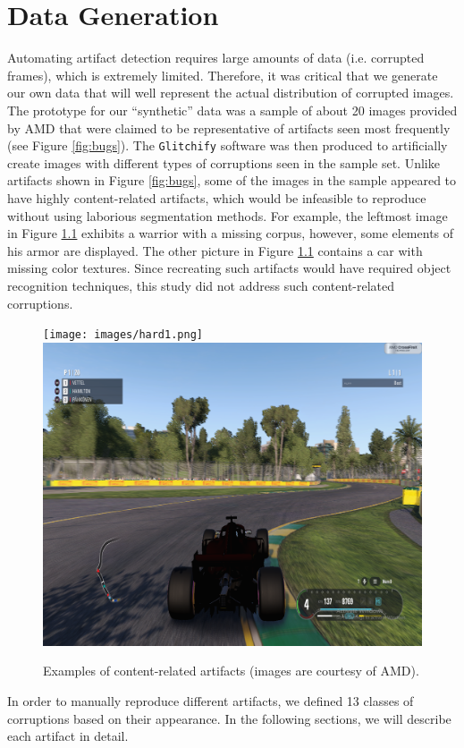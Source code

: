 \chapter{Data Generation}\label{Ch:datagen}

Automating artifact detection requires large amounts of data (i.e. corrupted frames), which is extremely limited. Therefore, it was critical that we generate our own data that will well represent the actual distribution of corrupted images. The prototype for our ``synthetic'' data was a sample of about 20 images provided by AMD that were claimed to be representative of artifacts seen most frequently (see Figure \ref{fig:bugs}). The \texttt{Glitchify} software was then produced to artificially create images with different types of corruptions seen in the sample set. Unlike artifacts shown in Figure \ref{fig:bugs}, some of the images in the sample appeared to have highly content-related artifacts, which would be infeasible to reproduce without using laborious segmentation methods. For example, the leftmost image in Figure \ref{fig:hard} exhibits a warrior with a missing corpus, however, some elements of his armor are displayed. The other picture in Figure \ref{fig:hard} contains a car with missing color textures. Since recreating such artifacts would have required object recognition techniques, this study did not address such content-related corruptions.

\begin{figure}[H]
\centering
\texttt{[image: images/hard1.png]}
\includegraphics[scale=0.181]{images/hard2.png}
\vspace{5pt}
\caption[Examples of content-related artifacts]{Examples of content-related artifacts (images are courtesy of AMD).}
\label{fig:hard}
\end{figure}
\noindent
In order to manually reproduce different artifacts, we defined 13 classes of corruptions based on their appearance.
In the following sections, we will describe each artifact in detail.

